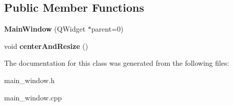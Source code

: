 \subsection*{Public Member Functions}
\begin{DoxyCompactItemize}
\item 
\hypertarget{classMainWindow_a8b244be8b7b7db1b08de2a2acb9409db}{{\bfseries Main\-Window} (Q\-Widget $\ast$parent=0)}\label{classMainWindow_a8b244be8b7b7db1b08de2a2acb9409db}

\item 
\hypertarget{classMainWindow_a8f8abba152c87470c2c539a30a836abe}{void {\bfseries center\-And\-Resize} ()}\label{classMainWindow_a8f8abba152c87470c2c539a30a836abe}

\end{DoxyCompactItemize}


The documentation for this class was generated from the following files\-:\begin{DoxyCompactItemize}
\item 
main\-\_\-window.\-h\item 
main\-\_\-window.\-cpp\end{DoxyCompactItemize}
